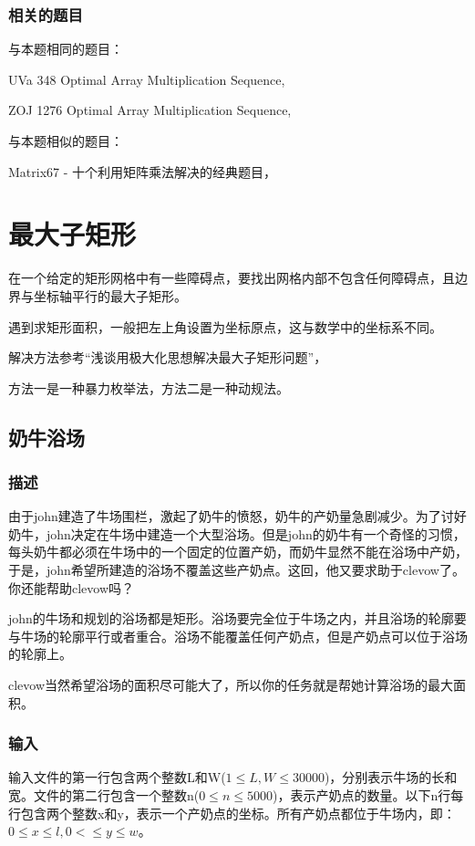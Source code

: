 \subsubsection{相关的题目}
与本题相同的题目：
\begindot
\item UVa 348 Optimal Array Multiplication Sequence, 
\item ZOJ 1276 Optimal Array Multiplication Sequence, 
\myenddot

与本题相似的题目：
\begindot
\item Matrix67 - 十个利用矩阵乘法解决的经典题目，
\myenddot


\section{最大子矩形} %
在一个给定的矩形网格中有一些障碍点，要找出网格内部不包含任何障碍点，且边界与坐标轴平行的最大子矩形。

遇到求矩形面积，一般把左上角设置为坐标原点，这与数学中的坐标系不同。

解决方法参考“浅谈用极大化思想解决最大子矩形问题”，

方法一是一种暴力枚举法，方法二是一种动规法。

\subsection{奶牛浴场}
\subsubsection{描述}
由于john建造了牛场围栏，激起了奶牛的愤怒，奶牛的产奶量急剧减少。为了讨好奶牛，john决定在牛场中建造一个大型浴场。但是john的奶牛有一个奇怪的习惯，每头奶牛都必须在牛场中的一个固定的位置产奶，而奶牛显然不能在浴场中产奶，于是，john希望所建造的浴场不覆盖这些产奶点。这回，他又要求助于clevow了。你还能帮助clevow吗？

john的牛场和规划的浴场都是矩形。浴场要完全位于牛场之内，并且浴场的轮廓要与牛场的轮廓平行或者重合。浴场不能覆盖任何产奶点，但是产奶点可以位于浴场的轮廓上。

clevow当然希望浴场的面积尽可能大了，所以你的任务就是帮她计算浴场的最大面积。

\subsubsection{输入}
输入文件的第一行包含两个整数L和W($1 \leq L,W \leq 30000$)，分别表示牛场的长和宽。文件的第二行包含一个整数n($0 \leq n \leq 5000$)，表示产奶点的数量。以下n行每行包含两个整数x和y，表示一个产奶点的坐标。所有产奶点都位于牛场内，即：$0 \leq x \leq l, 0< \leq y \leq w$。

